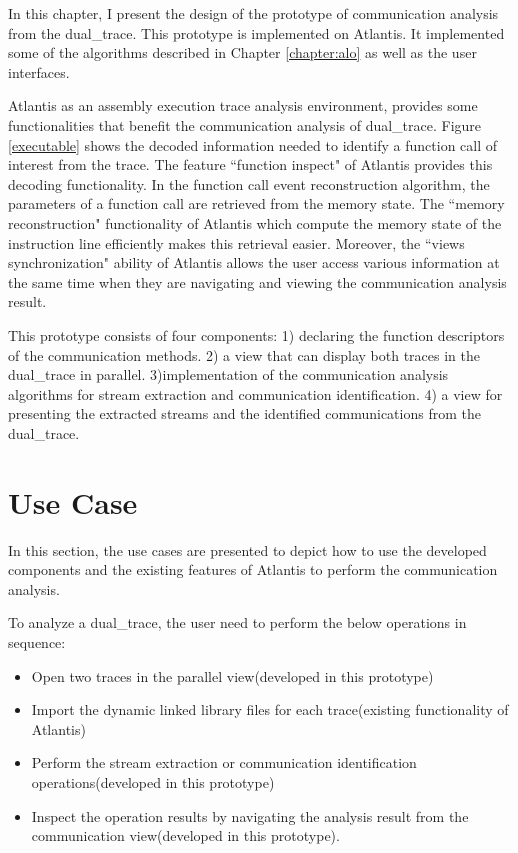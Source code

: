 

\label{chapter:newsol}
In this chapter, I present the design of the prototype of communication analysis from the dual\_trace. This prototype is implemented on Atlantis. It implemented some of the algorithms described in Chapter \ref{chapter:alo} as well as the user interfaces.

Atlantis as an assembly execution trace analysis environment, provides some functionalities that benefit the communication analysis of dual\_trace. Figure \ref{executable} shows the decoded information needed to identify a function call of interest from the trace. The feature ``function inspect" of Atlantis provides this decoding functionality. In the function call event reconstruction algorithm, the parameters of a function call are retrieved from the memory state. The ``memory reconstruction" functionality of Atlantis which compute the memory state of the instruction line efficiently makes this retrieval easier. Moreover, the ``views synchronization" ability of Atlantis allows the user access various information at the same time when they are navigating and viewing the communication analysis result.

This prototype consists of four components: 1) declaring the function descriptors of the communication methods. 2) a view that can display both traces in the dual\_trace in parallel. 3)implementation of the communication analysis algorithms for stream extraction and communication identification. 4) a view for presenting the extracted streams and the identified communications from the dual\_trace.

\section{Use Case}
In this section, the use cases are presented to depict how to use the developed components and the existing features of Atlantis to perform the communication analysis.

To analyze a dual\_trace, the user need to perform the below operations in sequence:
\begin{itemize}
\item Open two traces in the parallel view(developed in this prototype)
\item Import the dynamic linked library files for each trace(existing functionality of Atlantis)
\item Perform the stream extraction or communication identification operations(developed in this prototype)
\item Inspect the operation results by navigating the analysis result from the communication view(developed in this prototype).
\end{itemize}

